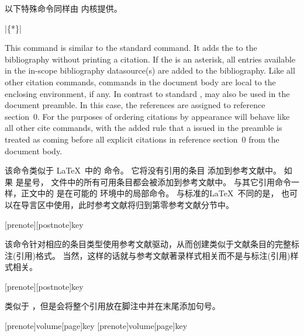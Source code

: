 
以下特殊命令同样由 \biblatex 内核提供。

\begin{ltxsyntax}

|\{*\}|

This command is similar to the standard \latex {} command. It
adds the  to the bibliography without printing a citation. If the
 is an asterisk, all entries available in the in-scope bibliography datasource(s) are added to the bibliography. Like all other citation commands,  commands in the document body are local to the enclosing  environment, if any. In contrast to standard \latex,  may also be used in the document preamble. In this case, the references are assigned to reference section~0. For the purposes of ordering citations by appearance  will behave like all other cite commands, with the added rule that a  issued in the preamble is treated as coming before all explicit citations in reference section~0 from the document body.


该命令类似于 \LaTeX\ 中的  命令。
它将没有引用的条目  添加到参考文献中。
如果  是星号， 文件中的所有可用条目都会被添加到参考文献中。
与其它引用命令一样，正文中的  是在可能的  环境中的局部命令。
与标准的\LaTeX\ 不同的是， 也可以在导言区中使用，此时参考文献将归到第零参考文献分节中。

[prenote][postnote]{key}


该命令针对相应的条目类型使用参考文献驱动，从而创建类似于文献条目的完整标注(引用)格式。
当然，这样的话就与参考文献著录样式相关而不是与标注(引用)样式相关。

[prenote][postnote]{key}


类似于 ，但是会将整个引用放在脚注中并在末尾添加句号。

[prenote]{volume}[page]{key}
[prenote]{volume}[page]{key}


\end{ltxsyntax}
